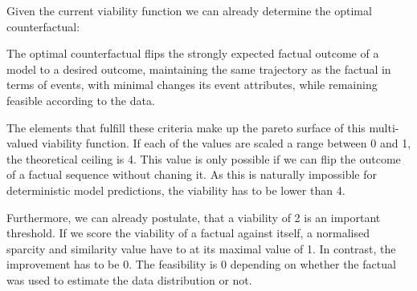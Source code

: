 \documentclass[./../../paper.tex]{subfiles}
\begin{document}
Given the current viability function we can already determine the optimal counterfactual:
\begin{displayquote}
    The optimal counterfactual flips the strongly expected factual outcome of a model to a desired outcome, maintaining the same trajectory as the factual in terms of events, with minimal changes its event attributes, while remaining feasible according to the data.
\end{displayquote}

\noindent The elements that fulfill these criteria make up the pareto surface of this multi-valued viability function. If each of the values are scaled a range between 0 and 1, the theoretical ceiling is 4. This value is only possible if we can flip the outcome of a factual sequence without chaning it. As this is naturally impossible for deterministic model predictions, the viability has to be lower than 4. 

Furthermore, we can already postulate, that a viability of 2 is an important threshold. If we score the viability of a factual against itself, a normalised sparcity and similarity value have to at its maximal value of 1. In contrast, the improvement has to be 0. The feasibility is 0 depending on whether the factual was used to estimate the data distribution or not.  
\end{document}
